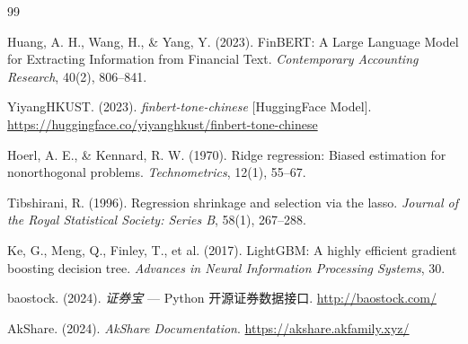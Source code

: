 \documentclass[12pt,a4paper]{ctexart}
\begin{document}
\begin{thebibliography}{99}

Huang, A. H., Wang, H., \& Yang, Y. (2023).
FinBERT: A Large Language Model for Extracting Information from Financial Text.
\textit{Contemporary Accounting Research}, 40(2), 806--841.

YiyangHKUST. (2023).
\textit{finbert-tone-chinese} [HuggingFace Model].
\url{https://huggingface.co/yiyanghkust/finbert-tone-chinese}

Hoerl, A. E., \& Kennard, R. W. (1970).
Ridge regression: Biased estimation for nonorthogonal problems.
\textit{Technometrics}, 12(1), 55--67.

Tibshirani, R. (1996).
Regression shrinkage and selection via the lasso.
\textit{Journal of the Royal Statistical Society: Series B}, 58(1), 267--288.

Ke, G., Meng, Q., Finley, T., et al. (2017).
LightGBM: A highly efficient gradient boosting decision tree.
\textit{Advances in Neural Information Processing Systems}, 30.

baostock. (2024).
\textit{证券宝} — Python 开源证券数据接口.
\url{http://baostock.com/}

AkShare. (2024).
\textit{AkShare Documentation}.
\url{https://akshare.akfamily.xyz/}

\end{thebibliography}
\end{document}
